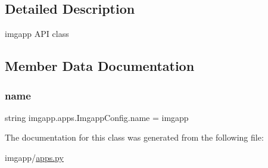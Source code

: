 \subsection{Detailed Description}
imgapp A\+PI class 

\subsection{Member Data Documentation}
\mbox{\label{classimgapp_1_1apps_1_1ImgappConfig_a3eafdf46b561d2f3764888b9e7cfe9e5}} 
\subsubsection{\texorpdfstring{name}{name}}
{\footnotesize\ttfamily string imgapp.\+apps.\+Imgapp\+Config.\+name = \textquotesingle{}imgapp\textquotesingle{}\hspace{0.3cm}{\ttfamily [static]}}



The documentation for this class was generated from the following file\+:\begin{DoxyCompactItemize}
\item 
imgapp/\hyperlink{apps_8py}{apps.\+py}\end{DoxyCompactItemize}
